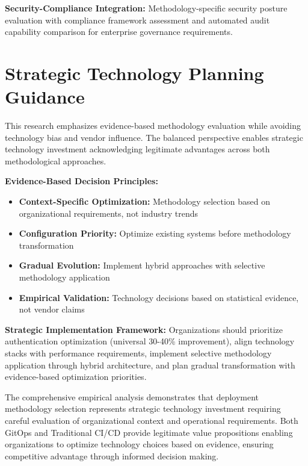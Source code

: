 \textbf{Security-Compliance Integration:} Methodology-specific security posture evaluation with compliance framework assessment and automated audit capability comparison for enterprise governance requirements.

\section{Strategic Technology Planning Guidance}
\label{sec:strategic_guidance}

This research emphasizes evidence-based methodology evaluation while avoiding technology bias and vendor influence. The balanced perspective enables strategic technology investment acknowledging legitimate advantages across both methodological approaches.

\textbf{Evidence-Based Decision Principles:}
\begin{itemize}
\item \textbf{Context-Specific Optimization:} Methodology selection based on organizational requirements, not industry trends
\item \textbf{Configuration Priority:} Optimize existing systems before methodology transformation
\item \textbf{Gradual Evolution:} Implement hybrid approaches with selective methodology application
\item \textbf{Empirical Validation:} Technology decisions based on statistical evidence, not vendor claims
\end{itemize}

\textbf{Strategic Implementation Framework:}
Organizations should prioritize authentication optimization (universal 30-40\% improvement), align technology stacks with performance requirements, implement selective methodology application through hybrid architecture, and plan gradual transformation with evidence-based optimization priorities.

The comprehensive empirical analysis demonstrates that deployment methodology selection represents strategic technology investment requiring careful evaluation of organizational context and operational requirements. Both GitOps and Traditional CI/CD provide legitimate value propositions enabling organizations to optimize technology choices based on evidence, ensuring competitive advantage through informed decision making.